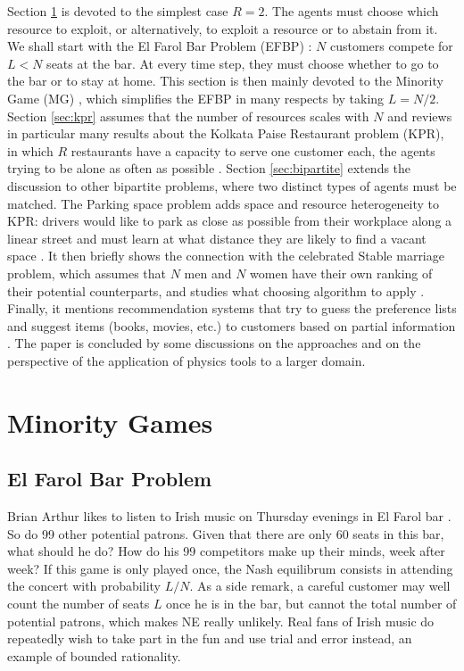 \documentclass[aps,twocolumn,nofootinbib,sortedaddress,reprint]{revtex4-1}
\begin{document}
Section \ref{sec:MG} is devoted to the simplest case $R=2$. The agents must choose which resource to exploit, or alternatively, to exploit a resource or to abstain from it.  We shall start with the El Farol Bar Problem (EFBP) \cite{Arthur}: $N$ customers compete for $L<N$ seats at the bar. At every time step, they must choose whether to go to the bar or to stay at home. This section is then mainly devoted to the Minority Game (MG) \cite{CZ97}, which simplifies the EFBP in many respects by taking $L=N/2$. Section \ref{sec:kpr} assumes that the number of resources scales with $N$ and reviews in particular many results about the Kolkata Paise Restaurant problem (KPR), in which $R$ restaurants
have a capacity to serve one customer each, the agents trying to be alone as often as possible
\cite{kpr-physica}. Section \ref{sec:bipartite} extends the discussion to other bipartite problems, where two distinct types of agents must be matched. The Parking space problem adds space and resource heterogeneity to KPR: drivers
would like to park as close as possible from their workplace
along a linear street and must learn at what distance they are likely
to find a vacant space \cite{Hanaki2011}.   It then briefly shows the connection with the celebrated Stable marriage
problem, which assumes that $N$ men and $N$ women have their own ranking of
their potential counterparts, and studies what choosing algorithm to
apply \cite{gale1962college}. Finally, it mentions recommendation systems that try to guess the preference lists and suggest items (books, movies, etc.) to customers based on
partial information \cite{lu2012recommender}. The paper is concluded by some discussions on the approaches and on the perspective of the application of physics tools to a larger domain.


\section{Minority Games}
\label{sec:MG}
\subsection{El Farol Bar Problem}
Brian Arthur likes to listen to Irish music on Thursday evenings in El Farol bar \textcite{Arthur}. So do 99 other potential patrons. Given that there are only 60 seats in this bar, what should he do? How do his 99 competitors make up their minds, week after week? If this game is only played once, the Nash equilibrum consists in attending the concert with probability $L/N$. As a side remark, a careful customer may well count the number of seats $L$ once he is in the bar, but cannot the total number of potential patrons, which makes NE really unlikely. Real fans of Irish music do repeatedly wish to take part in the fun and use trial and error instead, an example of bounded rationality.
\end{document}

